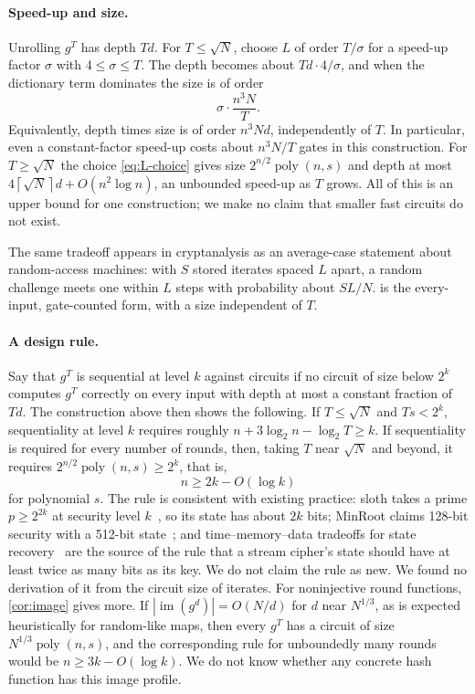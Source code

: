 \documentclass[11pt]{article}
\theoremstyle{definition}
\theoremstyle{remark}
\newcommand{\poly}{\operatorname{poly}}
\newcommand{\ceil}[1]{\left\lceil #1\right\rceil}
\numberwithin{equation}{section}
\begin{document}
\paragraph{Speed-up and size.}
Unrolling $g^T$ has depth $Td$.  For $T\leq\sqrt N$, choose $L$ of order
$T/\sigma$ for a speed-up factor $\sigma$ with $4\leq\sigma\leq T$.  The
depth becomes about $Td\cdot4/\sigma$, and when the dictionary term
dominates the size is of order
\[
  \sigma\cdot\frac{n^3N}{T}.
\]
Equivalently, depth times size is of order $n^3Nd$, independently of $T$.
In particular, even a constant-factor speed-up costs about $n^3N/T$
gates in this construction.  For $T\geq\sqrt N$ the choice
\cref{eq:L-choice} gives size $2^{n/2}\poly(n,s)$ and depth at most
$4\ceil{\sqrt N}d+O(n^2\log n)$, an unbounded speed-up as $T$ grows.  All of this
is an upper bound for one construction; we make no claim that smaller
fast circuits do not exist.

The same tradeoff appears in cryptanalysis as an average-case statement
about random-access machines: with $S$ stored iterates spaced $L$ apart,
a random challenge meets one within $L$ steps with probability about
$SL/N$.   is the every-input, gate-counted form, with a
size independent of $T$.

\paragraph{A design rule.}
Say that $g^T$ is sequential at level $k$ against circuits if no circuit
of size below $2^k$ computes $g^T$ correctly on every input with depth at
most a constant fraction of $Td$.  The construction above then shows the
following.  If $T\leq\sqrt N$ and $Ts<2^k$, sequentiality at level $k$ requires
roughly $n+3\log_2n-\log_2T\geq k$.  If sequentiality is required for every number
of rounds, then, taking $T$ near $\sqrt N$ and beyond, it requires
$2^{n/2}\poly(n,s)\geq2^k$, that is,
\[
  n\geq 2k-O(\log k)
\]
for polynomial $s$.  The rule is consistent with existing practice: sloth
takes a prime $p\geq2^{2k}$ at security level $k$~\cite[Section~3.3]{LW15},
so its state has about $2k$ bits; MinRoot claims 128-bit security with a
512-bit state~\cite[Claim~1]{KMT22}; and time--memory--data tradeoffs for
state recovery~\cite{BS00} are the source of the rule that a stream cipher's
state should have at least twice as many bits as its key.  We do not claim
the rule as new.  We found no derivation of it from the circuit size of
iterates.  For noninjective round functions, \cref{cor:image} gives more.
If $|\operatorname{im}(g^d)|=O(N/d)$ for $d$ near $N^{1/3}$, as is expected
heuristically for random-like maps, then every $g^T$ has a circuit of size
$N^{1/3}\poly(n,s)$, and the corresponding rule for unboundedly many rounds
would be $n\geq3k-O(\log k)$.  We do not know whether any concrete hash
function has this image profile.
\end{document}
